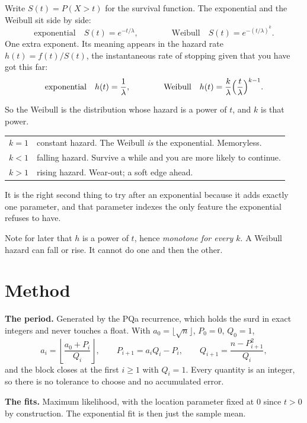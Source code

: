 \documentclass[12pt,a4paper]{article}
\begin{document}
Write $S(t) = P(X>t)$ for the survival function. The exponential and the Weibull sit side by side:
\[
  \text{exponential}\quad S(t) = e^{-t/\lambda},
  \qquad\qquad
  \text{Weibull}\quad S(t) = e^{-(t/\lambda)^k}.
\]
One extra exponent. Its meaning appears in the hazard rate $h(t)=f(t)/S(t)$, the instantaneous rate of stopping given that you have got this far:
\[
  \text{exponential}\quad h(t) = \frac{1}{\lambda},
  \qquad\qquad
  \text{Weibull}\quad h(t) = \frac{k}{\lambda}\Bigl(\frac{t}{\lambda}\Bigr)^{k-1}.
\]

So the Weibull is the distribution whose hazard is a power of $t$, and $k$ is that power.

\begin{center}
\begin{tabular}{ll}
\toprule
$k=1$ & constant hazard. The Weibull \emph{is} the exponential. Memoryless. \\
$k<1$ & falling hazard. Survive a while and you are more likely to continue. \\
$k>1$ & rising hazard. Wear-out; a soft edge ahead. \\
\bottomrule
\end{tabular}
\end{center}

It is the right second thing to try after an exponential because it adds exactly one parameter, and that parameter indexes the only feature the exponential refuses to have.

Note for later that $h$ is a power of $t$, hence \emph{monotone for every $k$}. A Weibull hazard can fall or rise. It cannot do one and then the other.

\section{Method}

\textbf{The period.} Generated by the PQa recurrence, which holds the surd in exact integers and never touches a float. With $a_0=\lfloor\sqrt n\rfloor$, $P_0=0$, $Q_0=1$,
\[
  a_i = \left\lfloor \frac{a_0+P_i}{Q_i} \right\rfloor,
  \qquad
  P_{i+1} = a_iQ_i - P_i,
  \qquad
  Q_{i+1} = \frac{n-P_{i+1}^2}{Q_i},
\]
and the block closes at the first $i\ge 1$ with $Q_i=1$. Every quantity is an integer, so there is no tolerance to choose and no accumulated error.

\textbf{The fits.} Maximum likelihood, with the location parameter fixed at $0$ since $t>0$ by construction. The exponential fit is then just the sample mean.
\end{document}
